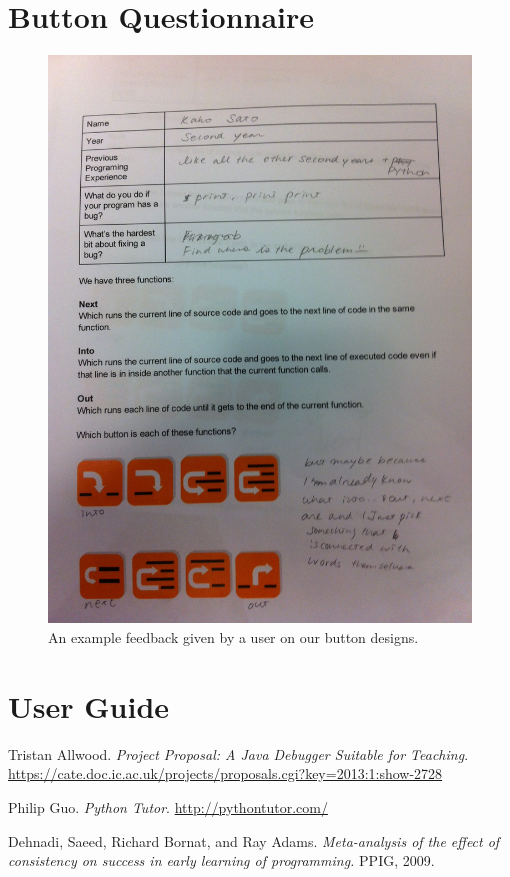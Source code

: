 \documentclass[11pt, a4paper]{article}
\begin{document}
\section{Button Questionnaire}
\label{sec:buttonquestionnaire}
\begin{figure}[h!]
\centering
\includegraphics[width=\textwidth]{questionnair2.jpg}
\caption{An example feedback given by a user on our button designs.}
\end{figure}

\section{User Guide}

\begin{thebibliography}{9}

	Tristan Allwood.
	\emph{Project Proposal: A Java Debugger Suitable for Teaching}.
	\url{https://cate.doc.ic.ac.uk/projects/proposals.cgi?key=2013:1:show-2728}

	Philip Guo.
	\emph{Python Tutor}.
	\url{http://pythontutor.com/}

	Dehnadi, Saeed, Richard Bornat, and Ray Adams. 
	\emph{Meta-analysis of the effect of consistency on success in early learning of programming.}
	PPIG, 2009.
\end{thebibliography}
\end{document}
